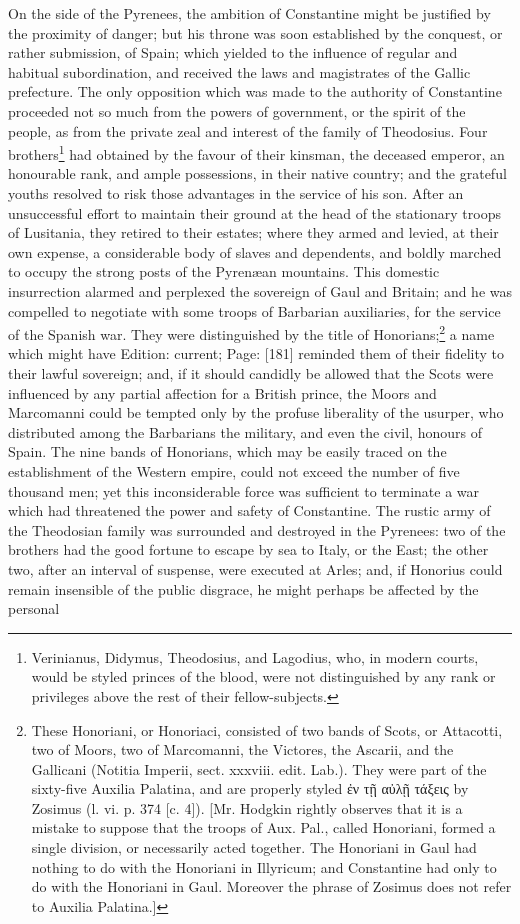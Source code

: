 On the side of the Pyrenees, the ambition of Constantine might be justified by the proximity of danger; but his throne was soon established by the conquest, or rather submission, of Spain; which yielded to the influence of regular and habitual subordination, and received the laws and magistrates of the Gallic prefecture. The only opposition which was made to the authority of Constantine proceeded not so much from the powers of government, or the spirit of the people, as from the private zeal and interest of the family of Theodosius. Four brothers\footnote{Verinianus, Didymus, Theodosius, and Lagodius, who, in modern courts, would be styled princes of the blood, were not distinguished by any rank or privileges above the rest of their fellow-subjects.} had obtained by the favour of their kinsman, the deceased emperor, an honourable rank, and ample possessions, in their native country; and the grateful youths resolved to risk those advantages in the service of his son. After an unsuccessful effort to maintain their ground at the head of the stationary troops of Lusitania, they retired to their estates; where they armed and levied, at their own expense, a considerable body of slaves and dependents, and boldly marched to occupy the strong posts of the Pyrenæan mountains. This domestic insurrection alarmed and perplexed the sovereign of Gaul and Britain; and he was compelled to negotiate with some troops of Barbarian auxiliaries, for the service of the Spanish war. They were distinguished by the title of Honorians;\footnote{These Honoriani, or Honoriaci, consisted of two bands of Scots, or Attacotti, two of Moors, two of Marcomanni, the Victores, the Ascarii, and the Gallicani (Notitia Imperii, sect. xxxviii. edit. Lab.). They were part of the sixty-five Auxilia Palatina, and are properly styled \textgreek{\texthebrew{ἐ}ν τ\texthebrew{ῇ} α\texthebrew{ὐ}λ\texthebrew{ῇ} τάξεις} by Zosimus (l. vi. p. 374 [c. 4]). [Mr. Hodgkin rightly observes that it is a mistake to suppose that the troops of Aux. Pal., called Honoriani, formed a single division, or necessarily acted together. The Honoriani in Gaul had nothing to do with the Honoriani in Illyricum; and Constantine had only to do with the Honoriani in Gaul. Moreover the phrase of Zosimus does not refer to Auxilia Palatina.]} a name which might have Edition: current; Page: [181] reminded them of their fidelity to their lawful sovereign; and, if it should candidly be allowed that the Scots were influenced by any partial affection for a British prince, the Moors and Marcomanni could be tempted only by the profuse liberality of the usurper, who distributed among the Barbarians the military, and even the civil, honours of Spain. The nine bands of Honorians, which may be easily traced on the establishment of the Western empire, could not exceed the number of five thousand men; yet this inconsiderable force was sufficient to terminate a war which had threatened the power and safety of Constantine. The rustic army of the Theodosian family was surrounded and destroyed in the Pyrenees: two of the brothers had the good fortune to escape by sea to Italy, or the East; the other two, after an interval of suspense, were executed at Arles; and, if Honorius could remain insensible of the public disgrace, he might perhaps be affected by the personal 